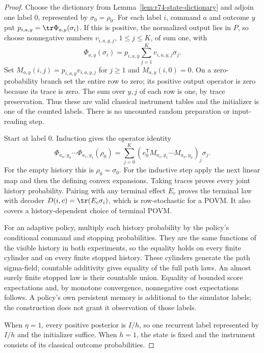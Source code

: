 \begin{proof}
Choose the dictionary from Lemma~\ref{lem:r74-state-dictionary} and adjoin
one label $0$, represented by $\sigma_0=\rho_0$. For each label $i$,
command $a$ and outcome $y$ put $p_{i,a,y}=\tr\Phi_{a,y}(\sigma_i)$.
If this is positive, the normalized output lies in $P$, so choose
nonnegative numbers $v_{i,a,y,j}$, $1\le j\le K$, of sum one, with
\[
 \Phi_{a,y}(\sigma_i)
     =p_{i,a,y}\sum_{j=1}^K v_{i,a,y,j}\sigma_j.
\]
Set $M_{a,y}(i,j)=p_{i,a,y}v_{i,a,y,j}$ for $j\ge1$ and
$M_{a,y}(i,0)=0$. On a zero-probability branch set the entire row to zero;
its positive output operator is zero because its trace is zero. The sum
over $y,j$ of each row is one, by trace preservation. Thus these are valid
classical instrument tables and the initializer is one of the counted labels.
There is no uncounted random preparation or input-reading step.

Start at label $0$. Induction gives the operator identity
\begin{equation}\label{eq:r74-instrument-intertwining}
 \Phi_{a_n,y_n}\cdots\Phi_{a_1,y_1}(\rho_0)
   =\sum_{j=0}^K
       (e_0^{\mathsf T}M_{a_1,y_1}\cdots M_{a_n,y_n})_j\sigma_j.
\end{equation}
For the empty history this is $\rho_0=\sigma_0$. For the inductive step
apply the next linear map and then the defining convex expansions.
Taking traces proves every joint history probability. Pairing with any
terminal effect $E_c$ proves the terminal law with decoder
$D(i,c)=\tr(E_c\sigma_i)$, which is row-stochastic for a POVM.
It also covers a history-dependent choice of terminal POVM.

For an adaptive policy, multiply each history probability by the policy's
conditional command and stopping probabilities. They are the same functions
of the visible history in both experiments, so the equality holds on every
finite cylinder and on every finite stopped history. These cylinders generate
the path sigma-field; countable additivity gives equality of the full path
laws. An almost surely finite stopped law is their countable union. Equality
of bounded score expectations and, by monotone convergence, nonnegative cost
expectations follows. A policy's own persistent memory is additional to the
simulator labels; the construction does not grant it observation of those
labels.

When $\eta=1$, every positive posterior is $I/h$, so one recurrent label
represented by $I/h$ and the initializer suffice. When $h=1$, the state is
fixed and the instrument consists of its classical outcome probabilities.
\end{proof}

